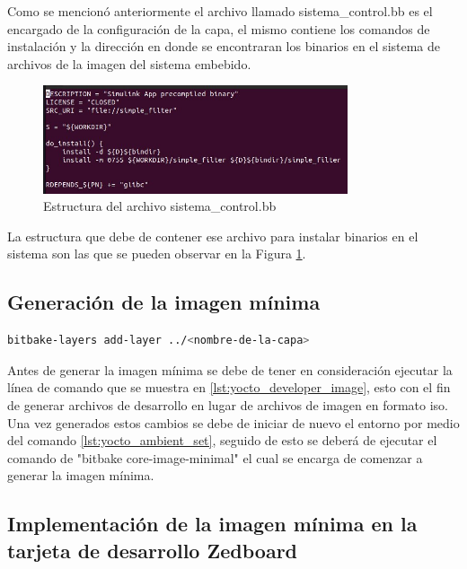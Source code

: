 Como se mencionó anteriormente el archivo llamado sistema\_control.bb es el encargado de la configuración de la capa, el mismo contiene los comandos de instalación y la dirección en donde se encontraran los binarios en el sistema de archivos de la imagen del sistema embebido.

\begin{figure}[h!]
    \centering
    \includegraphics[width=0.8\textwidth]{fig/especifico_2/bbfilestructure.jpg}
    \caption{Estructura del archivo sistema\_control.bb}
    \label{fig:estructura_archivo_bb}
\end{figure}

La estructura que debe de contener ese archivo para instalar binarios en el sistema son las que se pueden observar en la Figura \ref{fig:estructura_archivo_bb}.

\subsection{Generación de la imagen mínima}\label{subsec:generacion_imagen_minima}

\begin{lstlisting}[language=bash, caption={Generar archivos de desarrollador, Yocto }, label=lst:yocto_developer_image]
    bitbake-layers add-layer ../<nombre-de-la-capa>
\end{lstlisting}

Antes de generar la imagen mínima se debe de tener en consideración ejecutar la línea de comando que se muestra en \ref{lst:yocto_developer_image}, esto con el fin de generar archivos de desarrollo en lugar de archivos de imagen en formato iso. Una vez generados estos cambios se debe de iniciar de nuevo el entorno por medio del comando \ref{lst:yocto_ambient_set}, seguido de esto se deberá de ejecutar el comando de "bitbake core-image-minimal" el cual se encarga de comenzar a generar la imagen mínima.

\subsection{Implementación de la imagen mínima en la tarjeta de desarrollo Zedboard}


